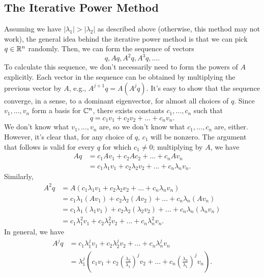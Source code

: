 \documentclass[letterpaper]{article}
\newcommand{\0}{\mathbf{0}}
\begin{document}
\subsection{The Iterative Power Method}
Assuming we have $|\lambda_1| > |\lambda_2|$ as described above (otherwise, this method may not work), the general idea behind the iterative power method is that we can pick $q \in \mathbb{R}^n$ randomly. Then, we can form the sequence of vectors
\[q, Aq, A^2 q, A^3 q, \hdots.\]
To calculate this sequence, we don't necessarily need to form the powers of $A$ explicitly. Each vector in the sequence can be obtained by multiplying the previous vector by $A$, e.g., $A^{j + 1}q = A(A^j q)$. It's easy to show that the sequence converge, in a sense, to a dominant eigenvector, for almost all choices of $q$. Since $v_1, \hdots, v_n$ form a basis for $\mathbb{C}^n$, there exists constants $c_1, \hdots, c_n$ such that  
\[q = c_1 v_1 + c_2 v_2 + \hdots + c_n v_n.\]
We don't know what $v_1, \hdots, v_n$ are, so we don't know what $c_1, \hdots, c_n$ are, either. However, it's clear that, for any choice of $q$, $c_1$ will be nonzero. The argument that follows is valid for every $q$ for which $c_1 \neq 0$; multiplying by $A$, we have 
\begin{equation*}
    \begin{aligned}
        Aq &= c_1 Av_1 + c_2 Ac_2 + \hdots + c_n Av_n \\ 
            &= c_1 \lambda_1 v_1 + c_2 \lambda_2 v_2 + \hdots + c_n  \lambda_n v_n.
    \end{aligned}
\end{equation*}
Similarly, 
\begin{equation*}
    \begin{aligned}
        A^2 q &= A(c_1 \lambda_1 v_1 + c_2 \lambda_2 v_2 + \hdots + c_n  \lambda_n v_n) \\
            &= c_1 \lambda_1 (Av_1) + c_2 \lambda_2 (Av_2) + \hdots + c_n \lambda_n (Av_n) \\ 
            &= c_1 \lambda_1 (\lambda_1 v_1) + c_2 \lambda_2 (\lambda_2 v_2) + \hdots + c_n \lambda_n (\lambda_n v_n) \\ 
            &= c_1 \lambda_1^2 v_1 + c_2 \lambda_2^2 v_2 + \hdots + c_n \lambda_n^2 v_n.
    \end{aligned}
\end{equation*}
In general, we have 
\begin{equation*}
    \begin{aligned}
        A^j q &= c_1 \lambda_1^j v_1 + c_2 \lambda_2^j v_2 + \hdots + c_n \lambda_n^j v_n \\ 
            &= \lambda_1^j \left(c_1 v_1 + c_2 \left(\frac{\lambda_2}{\lambda_1}\right)^j v_2 + \hdots + c_n \left(\frac{\lambda_n}{\lambda_1}\right)^j v_n\right).
    \end{aligned}
\end{equation*}
\end{document}
